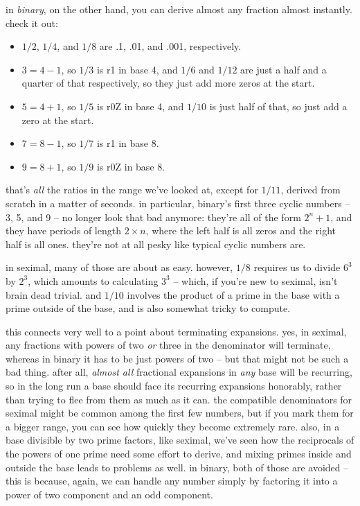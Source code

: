 \documentclass[../best.tex]{subfiles}
\begin{document}
in \emph{binary}, on the other hand, you can derive almost any fraction almost instantly. check it out:

\begin{itemize}
	\item $1/2$, $1/4$, and $1/8$ are .1, .01, and .001, respectively.
	\item $3 = 4 - 1$, so $1/3$ is r1 in base 4, and $1/6$ and $1/12$ are just a half and a quarter of that respectively, so they just add more zeros at the start.
	\item $5 = 4 + 1$, so $1/5$ is r0Z in base 4, and $1/10$ is just half of that, so just add a zero at the start.
	\item $7 = 8 - 1$, so $1/7$ is r1 in base 8.
	\item $9 = 8 + 1$, so $1/9$ is r0Z in base 8.
\end{itemize}

that's \emph{all} the ratios in the range we've looked at, except for $1/11$, derived from scratch in a matter of seconds. in particular, binary's first three cyclic numbers -- 3, 5, and 9 -- no longer look that bad anymore: they're all of the form $2^n + 1$, and they have periods of length $2 \times n$, where the left half is all zeros and the right half is all ones. they're not at all pesky like typical cyclic numbers are.

in seximal, many of those are about as easy. however, $1/8$ requires us to divide $6^3$ by $2^3$, which amounts to calculating $3^3$ -- which, if you're new to seximal, isn't brain dead trivial. and $1/10$ involves the product of a prime in the base with a prime outside of the base, and is also somewhat tricky to compute.

this connects very well to a point about terminating expansions. yes, in seximal, any fractions with powers of two \emph{or} three in the denominator will terminate, whereas in binary it has to be just powers of two -- but that might not be such a bad thing. after all, \emph{almost all} fractional expansions in \emph{any} base will be recurring,\myfootnote{} so in the long run a base should face its recurring expansions honorably, rather than trying to flee from them as much as it can. the compatible denominators for seximal might be common among the first few numbers, but if you mark them for a bigger range, you can see how quickly they become extremely rare. also, in a base divisible by two prime factors, like seximal, we've seen how the reciprocals of the powers of one prime need some effort to derive, and mixing primes inside and outside the base leads to problems as well. in binary, both of those are avoided -- this is because, again, we can handle any number simply by factoring it into a power of two component and an odd component.\myfootnote{}
\end{document}
